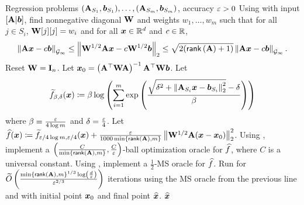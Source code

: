 \begin{algorithm}[H]
\caption{\textsf{MinMaxRegression}: optimizes \eqref{eq:main_objective} to $(1+\eps)$-multiplicative error}
\label{alg:fair_regression}
\begin{algorithmic}[1]
\Require Regression problems $(\mathbf{A}_{S_1},\bm{b}_{S_1}),\dots,(\mathbf{A}_{S_m},\bm{b}_{S_m})$, accuracy $\varepsilon > 0$
\State Using \cite[Algorithm 2]{mo23} with input $\left[\mathbf{A} \vert \bm{b}\right]$, find nonnegative diagonal $\mathbf{W}$ and weights $w_1,\dots,w_m$ such that for all $j \in S_i$, $\mathbf{W}[j][j] = w_i$ and for all $\bm{x}\in\mathbb{R}^{d}$ and $c \in \mathbb{R}$,
\begin{align*}
    \left\lVert \mathbf{A}\bm{x}-c\bm{b} \right\rVert_{\mathcal{G}_{\infty}} \le \left\lVert \mathbf{W}^{1/2}\mathbf{A}\bm{x}-c\mathbf{W}^{1/2}\bm{b} \right\rVert_2 \le \sqrt{2(\mathsf{rank}\left(\mathbf{A}    \right)+1)}\left\lVert \mathbf{A}\bm{x}-c\bm{b} \right\rVert_{\mathcal{G}_{\infty}}.
\end{align*}\label{line:blw}
 
    \State Reset $\mathbf{W} = \mathbf{I}_n$.
\EndIf
\State Let $\bm{x}_0 = \left(\mathbf{A}^{\top}\mathbf{W}\mathbf{A}\right)^{-1}\mathbf{A}^{\top}\mathbf{W}\bm{b}$. 
\State Let
\begin{align*}
    \widetilde{f}_{\beta,\delta}(\bm{x}) \coloneqq \beta\log\left(\sum_{i=1}^m \mathrm{exp}\left(\frac{\sqrt{\delta^2 + \left\lVert \mathbf{A}_{S_i}\bm{x}-\bm{b}_{S_i} \right\rVert_2^2}-\delta}{\beta}\right)\right)
\end{align*}
where $\beta = \frac{\varepsilon}{4\log m}$ and $\delta = \frac{\varepsilon}{4}$. 
\State Let $\widehat{f}(\bm{x}) \coloneqq \widetilde{f}_{\varepsilon/4\log m, \varepsilon/4}(\bm{x}) + \frac{\varepsilon}{1000\min\left\{\mathsf{rank}\left(\mathbf{A}\right),m\right\}}\left\lVert \mathbf{W}^{1/2}\mathbf{A}(\bm{x}-\bm{x}_0) \right\rVert_2^2$.
\State Using \cite[Algorithm 3]{msbacon}, implement a $\left(\frac{C}{\min\left\{\mathsf{rank}\left(\mathbf{A}\right),m\right\}},\frac{C}{\varepsilon}\right)$-ball optimization oracle for $\widehat{f}$, where $C$ is a universal constant. 
\State Using \cite[Algorithm 2]{msbacon}, implement a $\frac{1}{2}$-MS oracle for $\widehat{f}$.
\State Run \cite[Algorithm 1]{msbacon} for $\widetilde{O}\left(\frac{\min\left\{\mathsf{rank}\left(\mathbf{A}\right),m\right\}^{1/3}\log\left(\frac{d}{\varepsilon}\right)}{\varepsilon^{2/3}}\right)$ iterations using the MS oracle from the previous line and with initial point $\bm{x}_0$ and final point $\widehat{\bm{x}}$.
\State \Return $\widehat{\bm{x}}$
\end{algorithmic}
\end{algorithm}





% 
% 

